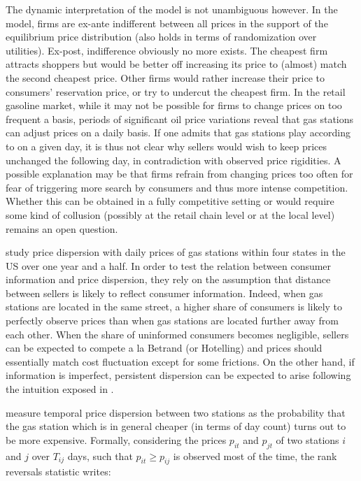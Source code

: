 \documentclass[english]{article}
\begin{document}
The dynamic interpretation of the model is not unambiguous however. In the model, firms are ex-ante indifferent between all prices in the support of the equilibrium price distribution (also holds in terms of randomization over utilities). Ex-post, indifference obviously no more exists. The cheapest firm attracts shoppers but would be better off increasing its price to (almost) match the second cheapest price. Other firms would rather increase their price to consumers' reservation price, or try to undercut the cheapest firm. In the retail gasoline market, while it may not be possible for firms to change prices on too frequent a basis, periods of significant oil price variations reveal that gas stations can adjust prices on a daily basis. If one admits that gas stations play according to \cite{VAR80} on a given day, it is thus not clear why sellers would wish to keep prices unchanged the following day, in contradiction with observed price rigidities. A possible explanation may be that firms refrain from changing prices too often for fear of triggering more search by consumers and thus more intense competition. Whether this can be obtained in a fully competitive setting  or would require some kind of collusion (possibly at the retail chain level or at the local level) remains an open question.

\cite{TAP11} study price dispersion with daily prices of gas stations within four states in the US over one year and a half. In order to test the relation between consumer information and price dispersion, they rely on the assumption that distance between sellers is likely to reflect consumer information. Indeed, when gas stations are located in the same street, a higher share of consumers is likely to perfectly observe prices than when gas stations are located further away from each other. When the share of uninformed consumers becomes negligible, sellers can be expected to compete a la Betrand (or Hotelling) and prices should essentially match cost fluctuation except for some frictions. On the other hand, if information is imperfect, persistent dispersion can be expected to arise following the intuition exposed in \cite{VAR80}.

\cite{TAP11} measure temporal price dispersion between two stations as the probability that the gas station which is in general cheaper (in terms of day count) turns out to be more expensive. Formally, considering the prices $p_{it}$ and $p_{jt}$ of two stations $i$ and $j$ over $T_{ij}$ days, such that $p_{it} \ge p_{ij}$ is observed most of the time, the rank reversals statistic writes:
\end{document}
